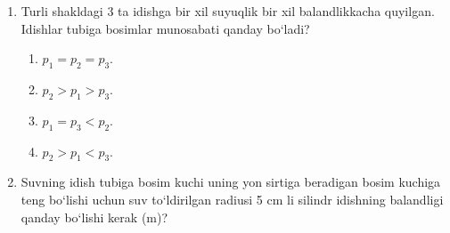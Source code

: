 \begin{enumerate}
\begin{enumerate}[label=\Alph*)]
\item $p_{\text{suv}}=p_{\text{ker}},$ egilmaydi.
\item $p_{\text{suv}}>p_{\text{ker}},$ suv tomonga.
\item $p_{\text{suv}}>p_{\text{ker}},$ kerosin tomonga.
\item $p_{\text{ker}}>p_{\text{suv}},$ kerosin tomonga.
\end{enumerate}



\item Turli shakldagi 3 ta idishga bir xil suyuqlik bir xil balandlikkacha quyilgan. 
Idishlar tubiga bosimlar munosabati qanday bo‘ladi?


\begin{enumerate}[label=\Alph*)]
\item $p_1=p_2=p_3$.
\item $p_2>p_1>p_3$.
\item $p_1=p_3<p_2$.
\item $p_2>p_1<p_3$.
\end{enumerate}


\item Suvning idish tubiga bosim kuchi uning yon sirtiga beradigan bosim kuchiga teng bo‘lishi uchun suv to‘ldirilgan radiusi 5 cm li silindr idishning balandligi qanday bo‘lishi kerak (m)?


\end{enumerate}
